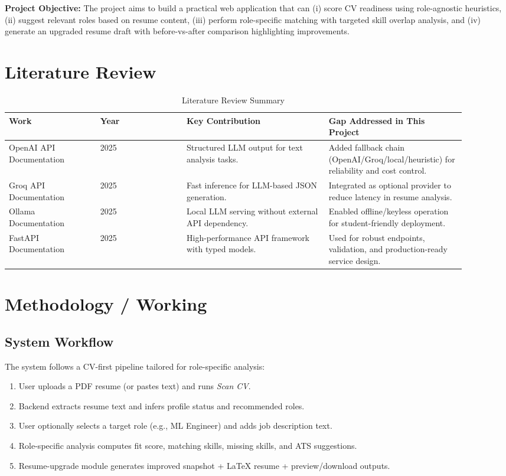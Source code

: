 \documentclass[conference]{IEEEtran}
\begin{document}
\textbf{Project Objective:} The project aims to build a practical web application that can (i) score CV readiness using role-agnostic heuristics, (ii) suggest relevant roles based on resume content, (iii) perform role-specific matching with targeted skill overlap analysis, and (iv) generate an upgraded resume draft with before-vs-after comparison highlighting improvements.

\section{Literature Review}
\begin{table}[htbp]
\caption{Literature Review Summary}
\label{tab:lit_review}
\centering
\footnotesize
\begin{tabular}{p{0.18\linewidth} p{0.17\linewidth} p{0.28\linewidth} p{0.27\linewidth}}
\toprule
\textbf{Work} & \textbf{Year} & \textbf{Key Contribution} & \textbf{Gap Addressed in This Project} \\
\midrule
OpenAI API Documentation~\cite{openai_docs} & 2025 & Structured LLM output for text analysis tasks. & Added fallback chain (OpenAI/Groq/local/heuristic) for reliability and cost control. \\
Groq API Documentation~\cite{groq_docs} & 2025 & Fast inference for LLM-based JSON generation. & Integrated as optional provider to reduce latency in resume analysis. \\
Ollama Documentation~\cite{ollama_docs} & 2025 & Local LLM serving without external API dependency. & Enabled offline/keyless operation for student-friendly deployment. \\
FastAPI Documentation~\cite{fastapi_docs} & 2025 & High-performance API framework with typed models. & Used for robust endpoints, validation, and production-ready service design. \\
\bottomrule
\end{tabular}
\end{table}

\section{Methodology / Working}
\subsection{System Workflow}
The system follows a CV-first pipeline tailored for role-specific analysis:
\begin{enumerate}
    \item User uploads a PDF resume (or pastes text) and runs \textit{Scan CV}.
    \item Backend extracts resume text and infers profile status and recommended roles.
    \item User optionally selects a target role (e.g., ML Engineer) and adds job description text.
    \item Role-specific analysis computes fit score, matching skills, missing skills, and ATS suggestions.
    \item Resume-upgrade module generates improved snapshot + LaTeX resume + preview/download outputs.
\end{enumerate}
\end{document}
